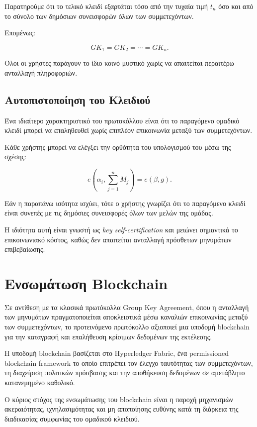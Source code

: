 \documentclass[12pt,a4paper]{report}
\begin{document}
Παρατηρούμε ότι το τελικό κλειδί εξαρτάται τόσο από την τυχαία τιμή \(t_n\) όσο και από το σύνολο των δημόσιων συνεισφορών όλων των συμμετεχόντων.

Επομένως:

\[
GK_1=GK_2=\cdots=GK_n.
\]

Όλοι οι χρήστες παράγουν το ίδιο κοινό μυστικό χωρίς να απαιτείται περαιτέρω ανταλλαγή πληροφοριών.

\subsection{Αυτοπιστοποίηση του Κλειδιού}

Ένα ιδιαίτερο χαρακτηριστικό του πρωτοκόλλου είναι ότι το παραγόμενο ομαδικό κλειδί μπορεί να επαληθευθεί χωρίς επιπλέον επικοινωνία μεταξύ των συμμετεχόντων.

Κάθε χρήστης μπορεί να ελέγξει την ορθότητα του υπολογισμού του μέσω της σχέσης:

\[
e
\left(
\alpha_i,
\sum_{j=1}^{n}M_j
\right)
=
e(\beta,g).
\]

Εάν η παραπάνω ισότητα ισχύει, τότε ο χρήστης γνωρίζει ότι το παραγόμενο κλειδί είναι συνεπές με τις δημόσιες συνεισφορές όλων των μελών της ομάδας.

Η ιδιότητα αυτή είναι γνωστή ως \textit{key self-certification} και μειώνει σημαντικά το επικοινωνιακό κόστος, καθώς δεν απαιτείται ανταλλαγή πρόσθετων μηνυμάτων επιβεβαίωσης.

\section{Ενσωμάτωση Blockchain}

Σε αντίθεση με τα κλασικά πρωτόκολλα Group Key Agreement, όπου η ανταλλαγή των μηνυμάτων πραγματοποιείται αποκλειστικά μέσω καναλιών επικοινωνίας μεταξύ των συμμετεχόντων, το προτεινόμενο πρωτόκολλο αξιοποιεί μια υποδομή blockchain για την καταγραφή και επαλήθευση κρίσιμων δεδομένων της εκτέλεσης.

Η υποδομή blockchain βασίζεται στο Hyperledger Fabric, ένα permissioned blockchain framework το οποίο επιτρέπει τον έλεγχο ταυτότητας των συμμετεχόντων, τη διαχείριση πολιτικών πρόσβασης και την αποθήκευση δεδομένων σε αμετάβλητο κατανεμημένο καθολικό.

Ο κύριος στόχος της ενσωμάτωσης του blockchain είναι η παροχή μηχανισμών ακεραιότητας, ιχνηλασιμότητας και μη αποποίησης ευθύνης κατά τη διάρκεια της διαδικασίας συμφωνίας του ομαδικού κλειδιού.
\end{document}
